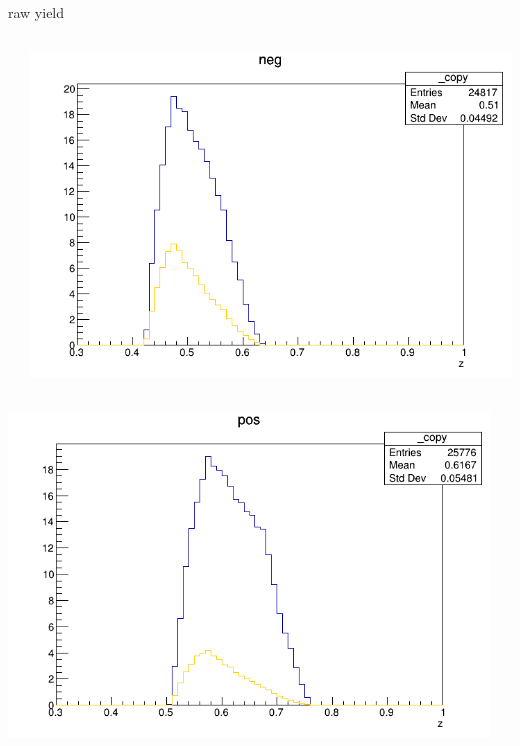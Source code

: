 \begin{frame}{raw yield}
\begin{columns}
\begin{column}[T]{0.25\textwidth}
\end{column}
\begin{column}[T]{0.25\textwidth}
\includegraphics[width = \textwidth]{results/yield/statistics/yield_x_Q2_z_0.35_4.000_0.50_neg.png}
\end{column}
\end{columns}
\begin{columns}
\begin{column}[T]{0.25\textwidth}
\includegraphics[width = \textwidth]{results/yield/statistics/yield_x_Q2_z_0.35_4.000_0.60_pos.png}
\end{column}
\begin{column}[T]{0.25\textwidth}

\end{column}
\end{columns}
\end{frame}

